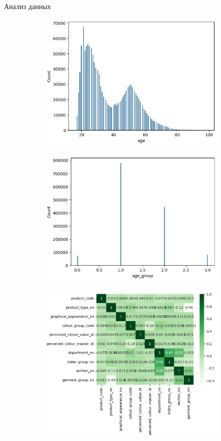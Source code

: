 \documentclass{beamer}
\begin{document}
\begin{frame}{Анализ данных}
  \begin{figure}
    \begin{subfigure}{.5\textwidth}
      \centering
      \includegraphics[width=.9\linewidth]{6}
      \label{fig:sfig1}
    \end{subfigure}%
    \begin{subfigure}{.5\textwidth}
      \centering
      \includegraphics[width=.9\linewidth]{7}
      \label{fig:sfig2}
    \end{subfigure}
    \begin{subfigure}{.5\textwidth}
      \centering
      \includegraphics[width=.8\linewidth]{8}

\end{subfigure}
\end{figure}
\end{frame}
\end{document}
